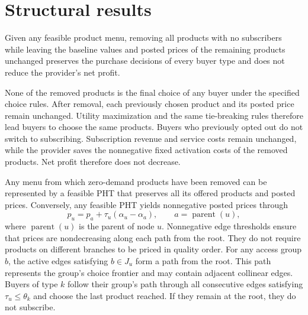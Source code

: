 \setcounter{section}{3}
\section{Structural results}

\begin{lemma}\label{lem:zero_demand}
Given any feasible product menu, removing all products with no subscribers while leaving the baseline values and posted prices of the remaining products unchanged preserves the purchase decisions of every buyer type and does not reduce the provider's net profit.
\end{lemma}

\begin{IEEEproof}
None of the removed products is the final choice of any buyer under the specified choice rules. After removal, each previously chosen product and its posted price remain unchanged. Utility maximization and the same tie-breaking rules therefore lead buyers to choose the same products. Buyers who previously opted out do not switch to subscribing. Subscription revenue and service costs remain unchanged, while the provider saves the nonnegative fixed activation costs of the removed products. Net profit therefore does not decrease.%
\end{IEEEproof}

\begin{theorem}\label{thm:tree_representation}
Any menu from which zero-demand products have been removed can be represented by a feasible PHT that preserves all its offered products and posted prices. Conversely, any feasible PHT yields nonnegative posted prices through
\begin{equation}
p_u=p_a+\tau_u(\alpha_u-\alpha_a),
\qquad a=\operatorname{parent}(u),
\label{eq:s4_5}
\tag{9}
\end{equation}
where $\operatorname{parent}(u)$ is the parent of node $u$. Nonnegative edge thresholds ensure that prices are nondecreasing along each path from the root. They do not require products on different branches to be priced in quality order. For any access group $b$, the active edges satisfying $b\in J_u$ form a path from the root. This path represents the group's choice frontier and may contain adjacent collinear edges. Buyers of type $k$ follow their group's path through all consecutive edges satisfying $\tau_u\le\theta_k$ and choose the last product reached. If they remain at the root, they do not subscribe.
\end{theorem}

